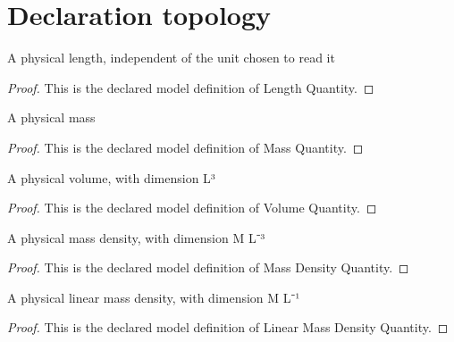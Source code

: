 \section{Declaration topology}
\begin{definition}
  \label{def:physics:phyx-mini-0167:phyxminiproblems-problemphyxmini0167-lengthquantity}
  A physical length, independent of the unit chosen to read it
\end{definition}
\begin{proof}
  This is the declared model definition of Length Quantity.
\end{proof}
\begin{definition}
  \label{def:physics:phyx-mini-0167:phyxminiproblems-problemphyxmini0167-massquantity}
  A physical mass
\end{definition}
\begin{proof}
  This is the declared model definition of Mass Quantity.
\end{proof}
\begin{definition}
  \label{def:physics:phyx-mini-0167:phyxminiproblems-problemphyxmini0167-volumequantity}
  A physical volume, with dimension L³
\end{definition}
\begin{proof}
  This is the declared model definition of Volume Quantity.
\end{proof}
\begin{definition}
  \label{def:physics:phyx-mini-0167:phyxminiproblems-problemphyxmini0167-massdensityquantity}
  A physical mass density, with dimension M L⁻³
\end{definition}
\begin{proof}
  This is the declared model definition of Mass Density Quantity.
\end{proof}
\begin{definition}
  \label{def:physics:phyx-mini-0167:phyxminiproblems-problemphyxmini0167-linearmassdensityquantity}
  A physical linear mass density, with dimension M L⁻¹
\end{definition}
\begin{proof}
  This is the declared model definition of Linear Mass Density Quantity.
\end{proof}
